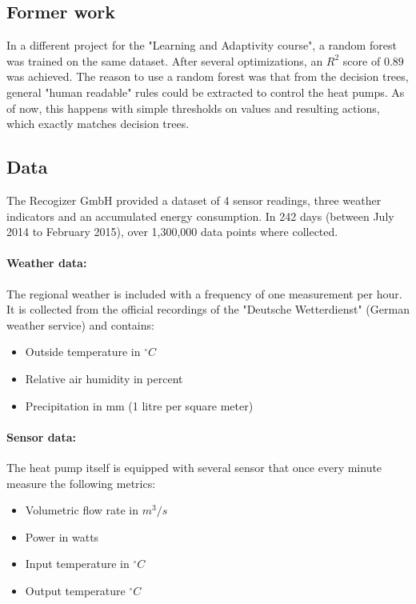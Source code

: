 \documentclass[conference]{IEEEtran}
\begin{document}
\subsection{Former work}
\label{sec:formerwork}
In a different project for the "Learning and Adaptivity course", a random forest was trained on the same dataset. After several optimizations, an $R^{2}$ score of $0.89$ was achieved. The reason to use a random forest was that from the decision trees, general "human readable" rules could be extracted to control the heat pumps. As of now, this happens with simple thresholds on values and resulting actions, which exactly matches decision trees.


\subsection{Data} 
\label{sec:data}
The Recogizer GmbH provided a dataset of 4 sensor readings, three weather indicators and an accumulated energy consumption. In 242 days (between July 2014 to February 2015), over 1,300,000 data points where collected.

\paragraph{Weather data:}
The regional weather is included with a frequency of one measurement per hour. It is collected from the official recordings of the "Deutsche Wetterdienst" (German weather service) and contains:

\begin{itemize}
	\item Outside temperature in $^\circ C$
	\item Relative air humidity in percent
	\item Precipitation in mm (1 litre per square meter)
\end{itemize}


\paragraph{Sensor data:}
The heat pump itself is equipped with several sensor that once every minute measure the following metrics:
\begin{itemize}
	\item Volumetric flow rate in $m^3 / s$
	\item Power in watts
	\item Input temperature in $^\circ C$
	\item Output temperature $^\circ C$
\end{itemize}
\end{document}
